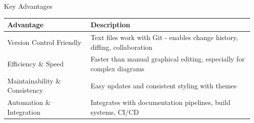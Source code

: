 \documentclass{beamer}
\begin{document}
\begin{frame}{Key Advantages}
    \begin{table}
    \small
    \begin{tabular}{p{} p{}}
    \textbf{Advantage} & \textbf{Description} \\
    \hline
    Version Control Friendly & Text files work with Git - enables change history, diffing, collaboration \\
    Efficiency \& Speed & Faster than manual graphical editing, especially for complex diagrams \\
    Maintainability \& Consistency & Easy updates and consistent styling with themes \\
    Automation \& Integration & Integrates with documentation pipelines, build systems, CI/CD \\
    \end{tabular}
    \end{table}
\end{frame}
\end{document}
